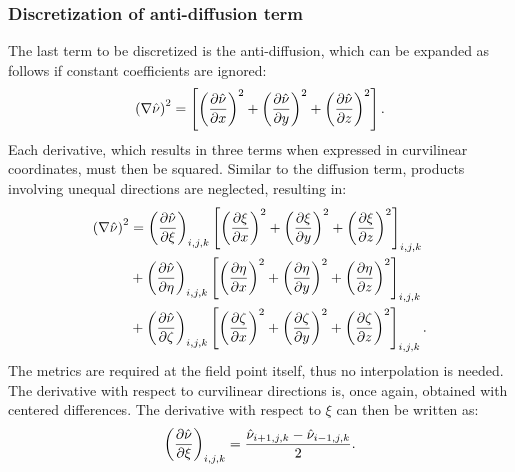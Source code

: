 \subsubsection{Discretization of anti-diffusion term}
%
The last term to be discretized is the anti-diffusion, which can be expanded as follows if constant coefficients are ignored:
\begin{equation*}
    \left(\nabla \sa\right)^2 = \left[
        \left(\pdiff{\sa}{x}\right)^2
        +\left(\pdiff{\sa}{y}\right)^2
        +\left(\pdiff{\sa}{z}\right)^2
    \right].
\end{equation*}
Each derivative, which results in three terms when expressed in curvilinear coordinates, must then be squared. Similar to the diffusion term, products involving unequal directions are neglected, resulting in:
\begin{align*}
    \left(\nabla \sa\right)^2 &=
    \left(\pdiff{\sa}{\xi}\right)_{i,j,k}\left[
        \left(\pdiff{\xi}{x}\right)^2
        + \left(\pdiff{\xi}{y}\right)^2
        + \left(\pdiff{\xi}{z}\right)^2
    \right]_{i,j,k}
    \\
    &+
        \left(\pdiff{\sa}{\eta}\right)_{i,j,k}\left[
        \left(\pdiff{\eta}{x}\right)^2
        + \left(\pdiff{\eta}{y}\right)^2
        + \left(\pdiff{\eta}{z}\right)^2
    \right]_{i,j,k}
    \\
    &+
        \left(\pdiff{\sa}{\zeta}\right)_{i,j,k}\left[
        \left(\pdiff{\zeta}{x}\right)^2
        + \left(\pdiff{\zeta}{y}\right)^2
        + \left(\pdiff{\zeta}{z}\right)^2
    \right]_{i,j,k}.
\end{align*}
The metrics are required at the field point itself, thus no interpolation is needed. The derivative with respect to curvilinear directions is, once again, obtained with centered differences. The derivative with respect to $\xi$ can then be written as:
\begin{equation*}
    \left(\pdiff{\sa}{\xi}\right)_{i,j,k} = \frac{\sa_{i+1,j,k} - \sa_{i-1,j,k}}{2}.
\end{equation*}
%
